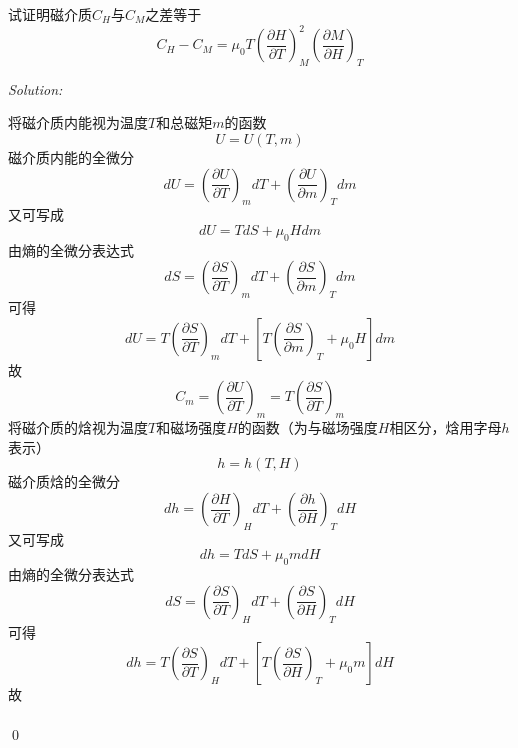 \documentclass[12pt,a4paper]{article}
\newenvironment{problem}[2][Problem]{\begin{trivlist}
\item[\hskip \labelsep {\bfseries #1}\hskip \labelsep {\bfseries #2.}]}{\end{trivlist}}
\newenvironment{sol}
    {\emph{Solution:}
    }
    {
    \qed
    }
\begin{document}
\begin{problem}{2.18}
试证明磁介质$C_H$与$C_M$之差等于
\[
C_H-C_M=\mu_0T\left(\frac{\partial H}{\partial T}\right)_M^2\left(\frac{\partial M}{\partial H}\right)_T
\]
\end{problem}
\begin{sol}
将磁介质内能视为温度$T$和总磁矩$m$的函数
\begin{equation}
U=U(T,m)
\end{equation}
磁介质内能的全微分
\begin{equation}
dU=\left(\frac{\partial U}{\partial T}\right)_mdT+\left(\frac{\partial U}{\partial m}\right)_Tdm
\end{equation}
又可写成
\begin{equation}
dU=TdS+\mu_0Hdm
\end{equation}
由熵的全微分表达式
\begin{equation}
dS=\left(\frac{\partial S}{\partial T}\right)_mdT+\left(\frac{\partial S}{\partial m}\right)_Tdm
\end{equation}
可得
\begin{equation}
dU=T\left(\frac{\partial S}{\partial T}\right)_mdT+\left[T\left(\frac{\partial S}{\partial m}\right)_T+\mu_0H\right]dm
\end{equation}
故
\begin{equation}
C_m=\left(\frac{\partial U}{\partial T}\right)_m=T\left(\frac{\partial S}{\partial T}\right)_m
\end{equation}
将磁介质的焓视为温度$T$和磁场强度$H$的函数（为与磁场强度$H$相区分，焓用字母$h$表示）
\begin{equation}
h=h(T,H)
\end{equation}
磁介质焓的全微分
\begin{equation}
dh=\left(\frac{\partial H}{\partial T}\right)_HdT+\left(\frac{\partial h}{\partial H}\right)_TdH
\end{equation}
又可写成
\begin{equation}
dh=TdS+\mu_0mdH
\end{equation}
由熵的全微分表达式
\begin{equation}
dS=\left(\frac{\partial S}{\partial T}\right)_HdT+\left(\frac{\partial S}{\partial H}\right)_TdH
\end{equation}
可得
\begin{equation}
dh=T\left(\frac{\partial S}{\partial T}\right)_HdT+\left[T\left(\frac{\partial S}{\partial H}\right)_T+\mu_0m\right]dH
\end{equation}
故
\begin{gather}

\end{gather}
\end{sol}
\end{document}
